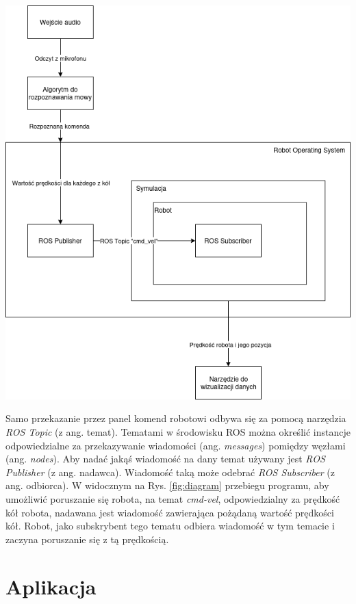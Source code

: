 \begin{center}
    \includegraphics[width=0.95\linewidth]{files/diagram.png}
    \label{fig:diagram}
\end{center}

Samo przekazanie przez panel komend robotowi odbywa się za pomocą narzędzia \textit{ROS Topic} (z ang. temat). Tematami w środowisku ROS można określić instancje odpowiedzialne za przekazywanie wiadomości (ang. \textit{messages}) pomiędzy węzłami (ang. \textit{nodes}). Aby nadać jakąś wiadomość na dany temat używany jest \textit{ROS Publisher} (z ang. nadawca). Wiadomość taką może odebrać \textit{ROS Subscriber} (z ang. odbiorca). W widocznym na Rys. \ref{fig:diagram} przebiegu programu, aby umożliwić poruszanie się robota, na temat \textit{cmd-vel}, odpowiedzialny za prędkość kół robota, nadawana jest wiadomość zawierająca pożądaną wartość prędkości kół. Robot, jako subskrybent tego tematu odbiera wiadomość w tym temacie i zaczyna poruszanie się z tą prędkością. 


\section{Aplikacja}
\label{sec:App}

